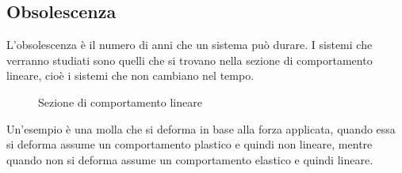 \documentclass[a4paper]{article}
\begin{document}
\subsection{Obsolescenza}
L'obsolescenza è il numero di anni che un sistema può durare. I sistemi che
verranno studiati sono quelli che si trovano nella sezione di comportamento lineare,
cioè i sistemi che non cambiano nel tempo.
\begin{figure}[H]
  \centering
  \caption{Sezione di comportamento lineare}
\end{figure}

\noindent
Un'esempio è una molla che si deforma in base alla forza applicata, quando essa
si deforma assume un comportamento plastico e quindi non lineare,
mentre quando non si deforma assume un comportamento elastico e quindi lineare.
\end{document}

